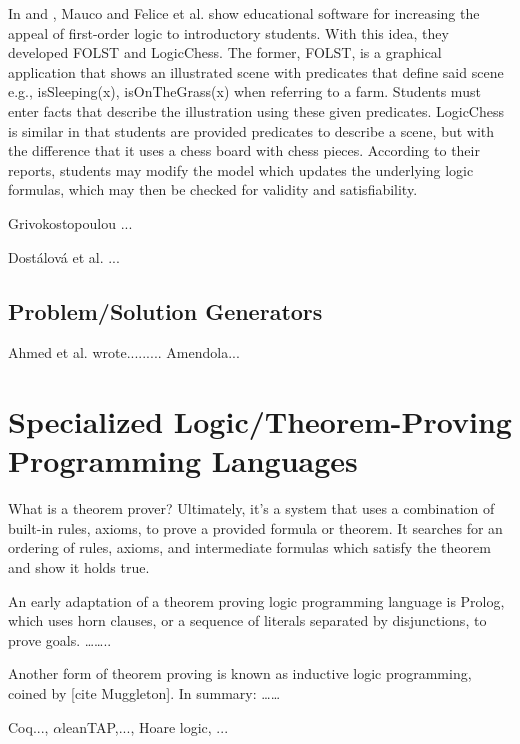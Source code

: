 \documentclass[ms]{uncgdissertationexp2}
\theoremstyle{plain}
\theoremstyle{definition}
\theoremstyle{remark}
\begin{document}
In \cite{mauco} and \cite{felice}, Mauco and Felice et al. show educational software for increasing the appeal of first-order logic to introductory students. With this idea, they developed FOLST and LogicChess. The former, FOLST, is a graphical application that shows an illustrated scene with predicates that define said scene e.g., isSleeping(x), isOnTheGrass(x) when referring to a farm. Students must enter facts that describe the illustration using these given predicates. LogicChess is similar in that students are provided predicates to describe a scene, but with the difference that it uses a chess board with chess pieces. According to their reports, students may modify the model which updates the underlying logic formulas, which may then be checked for validity and satisfiability. 

Grivokostopoulou \cite{grivokostopoulou}...

Dost\'alov\'a et al. \cite{organon}...

\subsection{Problem/Solution Generators}
Ahmed et al. wrote.........
Amendola... \cite{hardrandom}

\section{Specialized Logic/Theorem-Proving Programming Languages}
What is a theorem prover? Ultimately, it's a system that uses a combination of built-in rules, axioms, to prove a provided formula or theorem. It searches for an ordering of rules, axioms, and intermediate formulas which satisfy the theorem and show it holds true. 

An early adaptation of a theorem proving logic programming language is Prolog, which uses horn clauses, or a sequence of literals separated by disjunctions, to prove goals. ……..

Another form of theorem proving is known as inductive logic programming, coined by [cite Muggleton]. In summary: ……

Coq..., $\alpha$\textsf{lean}TAP,..., Hoare logic, ...
\end{document}
